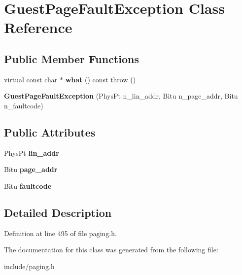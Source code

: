 \hypertarget{classGuestPageFaultException}{\section{Guest\-Page\-Fault\-Exception Class Reference}
\label{classGuestPageFaultException}
}
\subsection*{Public Member Functions}
\begin{DoxyCompactItemize}
\item 
\hypertarget{classGuestPageFaultException_a1bebaa50f525dd7556d947e96936b3b9}{virtual const char $\ast$ {\bfseries what} () const   throw ()}\label{classGuestPageFaultException_a1bebaa50f525dd7556d947e96936b3b9}

\item 
\hypertarget{classGuestPageFaultException_a2e8fc056edd06f2f4d466a2f2a09af5f}{{\bfseries Guest\-Page\-Fault\-Exception} (Phys\-Pt n\-\_\-lin\-\_\-addr, Bitu n\-\_\-page\-\_\-addr, Bitu n\-\_\-faultcode)}\label{classGuestPageFaultException_a2e8fc056edd06f2f4d466a2f2a09af5f}

\end{DoxyCompactItemize}
\subsection*{Public Attributes}
\begin{DoxyCompactItemize}
\item 
\hypertarget{classGuestPageFaultException_ab1a92143880433da862396ee81c28328}{Phys\-Pt {\bfseries lin\-\_\-addr}}\label{classGuestPageFaultException_ab1a92143880433da862396ee81c28328}

\item 
\hypertarget{classGuestPageFaultException_ab38013309d0af12e5c9def2b0c8ff77a}{Bitu {\bfseries page\-\_\-addr}}\label{classGuestPageFaultException_ab38013309d0af12e5c9def2b0c8ff77a}

\item 
\hypertarget{classGuestPageFaultException_a49906c9d52468c91f0b6218de7f21cc1}{Bitu {\bfseries faultcode}}\label{classGuestPageFaultException_a49906c9d52468c91f0b6218de7f21cc1}

\end{DoxyCompactItemize}


\subsection{Detailed Description}


Definition at line 495 of file paging.\-h.



The documentation for this class was generated from the following file\-:\begin{DoxyCompactItemize}
\item 
include/paging.\-h\end{DoxyCompactItemize}
